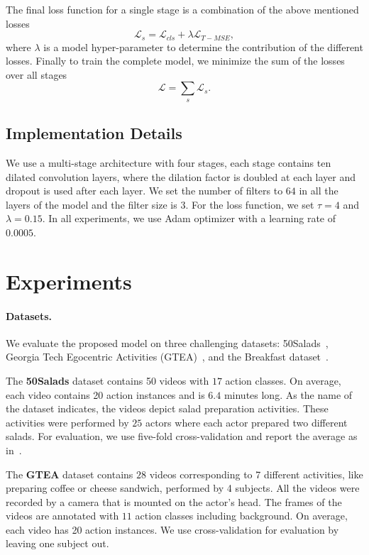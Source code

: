 \documentclass[10pt,twocolumn,letterpaper]{article}
\begin{document}
The final loss function for a single stage is a combination of the 
above mentioned losses
\begin{equation}
\mathcal{L}_s = \mathcal{L}_{cls} + \lambda \mathcal{L}_{T-MSE}, 
\end{equation}
where $\lambda$ is a model hyper-parameter to determine the contribution of 
the different losses. Finally to train the complete model, we minimize the 
sum of the losses over all stages
\begin{equation}
\mathcal{L} = \sum_s \mathcal{L}_{s} . 
\end{equation}


\subsection{Implementation Details}
\label{sec:implementation details}
We use a multi-stage architecture with four stages, each stage contains 
ten dilated convolution layers, where the dilation factor is doubled at 
each layer and dropout is used after each layer. We set the number of 
filters to $64$ in all the layers of the model and the filter size is $3$. 
For the loss function, we set $\tau = 4$ and $\lambda = 0.15$. In all experiments, 
we use Adam optimizer with a learning rate of $0.0005$.
\section{Experiments}
\paragraph{Datasets.} We evaluate the proposed model on three challenging 
datasets: 50Salads~\cite{stein2013combining}, Georgia Tech Egocentric Activities 
(GTEA)~\cite{fathi2011learning}, and the Breakfast dataset~\cite{kuehne2014language}.

The \textbf{50Salads} dataset contains 50 videos with $17$ action classes. 
On average, each video contains 20 action instances and is $6.4$ minutes long. 
As the name of the dataset indicates, the videos depict salad preparation 
activities. These activities were performed by $25$ actors where each actor 
prepared two different salads. For evaluation, we use five-fold cross-validation 
and report the average as in~\cite{stein2013combining}. 

The \textbf{GTEA} dataset contains $28$ videos corresponding to 7 different 
activities, like preparing coffee or cheese sandwich, performed by 4 subjects. 
All the videos were recorded by a camera that is mounted on the actor's head. 
The frames of the videos are annotated with $11$ action classes including 
background. On average, each video has 20 action instances. We use cross-validation 
for evaluation by leaving one subject out. 
\end{document}
